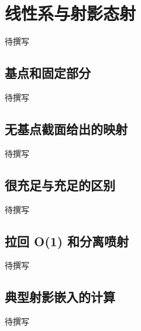 
% 
% 

\section{线性系与射影态射}
\label{g5:sec:1703}

待撰写

\subsection{基点和固定部分}
\label{g5:subsec:1703:01}
待撰写

\subsection{无基点截面给出的映射}
\label{g5:subsec:1703:02}
待撰写

\subsection{很充足与充足的区别}
\label{g5:subsec:1703:03}
待撰写

\subsection{拉回 O(1) 和分离喷射}
\label{g5:subsec:1703:04}
待撰写

\subsection{典型射影嵌入的计算}
\label{g5:subsec:1703:05}
待撰写
